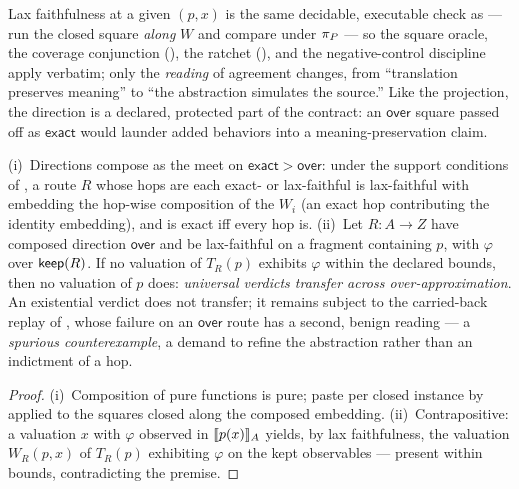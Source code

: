 Lax faithfulness at a given $(p, x)$ is the same decidable, executable
check as  --- run the closed square \emph{along} $W$
and compare under $\pi_P$ --- so the square oracle, the coverage
conjunction (), the ratchet (),
and the negative-control discipline apply verbatim; only the
\emph{reading} of agreement changes, from ``translation preserves
meaning'' to ``the abstraction simulates the source.'' Like the
projection, the direction is a declared, protected part of the
contract: an $\mathsf{over}$ square passed off as $\mathsf{exact}$
would launder added behaviors into a meaning-preservation claim.

\begin{proposition}
\label{prop:lax}
(i)~Directions compose as the meet on
$\mathsf{exact} > \mathsf{over}$: under the support conditions of
, a route $R$ whose hops are each exact- or
lax-faithful is lax-faithful with embedding the hop-wise composition of
the $W_i$ (an exact hop contributing the identity embedding), and is
exact iff every hop is.
(ii)~Let $R : A \to Z$ have composed direction $\mathsf{over}$ and be
lax-faithful on a fragment containing $p$, with $\varphi$ over
$\mathsf{keep}(R)$. If no valuation of $T_R(p)$ exhibits $\varphi$ within the
declared bounds, then no valuation of $p$ does: \emph{universal
verdicts transfer across over-approximation}. An existential verdict
does not transfer; it remains subject to the carried-back replay of
, whose failure on an $\mathsf{over}$ route has a
second, benign reading --- a \emph{spurious counterexample}, a demand to
refine the abstraction rather than an indictment of a hop.
\end{proposition}

\begin{proof}
(i)~Composition of pure functions is pure; paste per closed instance by
 applied to the squares closed along the composed
embedding. (ii)~Contrapositive: a valuation $x$ with
$\varphi$ observed in $\llbracket p(x) \rrbracket_{A}$ yields, by lax faithfulness, the
valuation $W_R(p,x)$ of $T_R(p)$ exhibiting $\varphi$ on the kept
observables --- present within bounds, contradicting the premise.
\end{proof}

